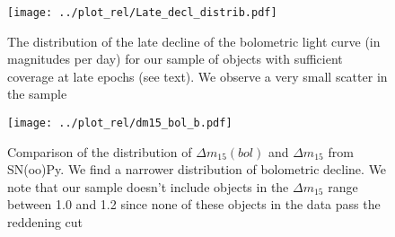 \begin{figure}
\texttt{[image: ../plot\_rel/Late\_decl\_distrib.pdf]}
\caption{The distribution of the late decline of the bolometric light curve (in magnitudes per day) for our sample of objects with sufficient coverage at late epochs (see text). We observe a very small
scatter in the sample}
\end{figure}
\begin{figure}
\texttt{[image: ../plot\_rel/dm15\_bol\_b.pdf]}
\caption{Comparison of the distribution of $\Delta m_{15}(bol)$ and  $\Delta m_{15}$ from SN(oo)Py. We find a narrower distribution of bolometric decline. We note that our sample doesn't
include objects in the $\Delta m_{15}$ range between 1.0 and 1.2 since none of these objects in the data pass the reddening cut}
\end{figure}
